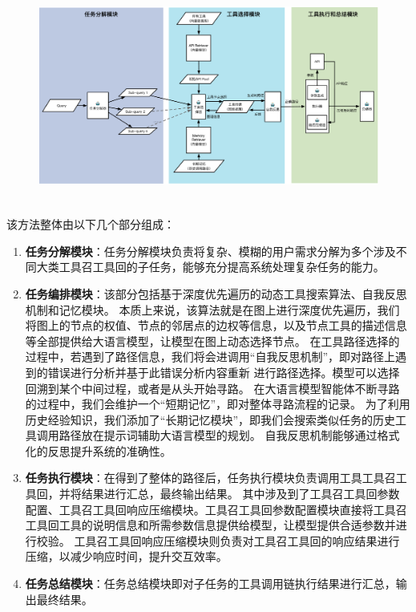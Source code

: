 \begin{figure}[!htp]
  \vspace{1em}
  \centering
  \setlength{\abovecaptionskip}{10pt} %
  \includegraphics[height=7cm]{../assets/ch4-整体框架图-3.pdf}
  \label{fig:ch4-framework}
\end{figure}

该方法整体由以下几个部分组成：

\begin{enumerate}
  \item \textbf{任务分解模块}：任务分解模块负责将复杂、模糊的用户需求分解为多个涉及不同大类工具召工具回的子任务，能够充分提高系统处理复杂任务的能力。
  \item \textbf{任务编排模块}：该部分包括基于深度优先遍历的动态工具搜索算法、自我反思机制和记忆模块。
  本质上来说，该算法就是在图上进行深度优先遍历，我们将图上的节点的权值、节点的邻居点的边权等信息，以及节点工具的描述信息等全部提供给大语言模型，让模型在图上动态选择节点。
  在工具路径选择的过程中，若遇到了路径信息，我们将会进调用“自我反思机制”，即对路径上遇到的错误进行分析并基于此错误分析内容重新
  进行路径选择。模型可以选择回溯到某个中间过程，或者是从头开始寻路。
  在大语言模型智能体不断寻路的过程中，我们会维护一个“短期记忆”，即对整体寻路流程的记录。
  为了利用历史经验知识，我们添加了“长期记忆模块”，即我们会搜索类似任务的历史工具调用路径放在提示词辅助大语言模型的规划。
  自我反思机制能够通过格式化的反思提升系统的准确性。
  \item \textbf{任务执行模块}：在得到了整体的路径后，任务执行模块负责调用工具工具召工具回，并将结果进行汇总，最终输出结果。
  其中涉及到了工具召工具回参数配置、工具召工具回响应压缩模块。工具召工具回参数配置模块直接将工具召工具回工具的说明信息和所需参数信息提供给模型，让模型提供合适参数并进行校验。
  工具召工具回响应压缩模块则负责对工具召工具回的响应结果进行压缩，以减少响应时间，提升交互效率。
  \item \textbf{任务总结模块}：任务总结模块即对子任务的工具调用链执行结果进行汇总，输出最终结果。
\end{enumerate}

